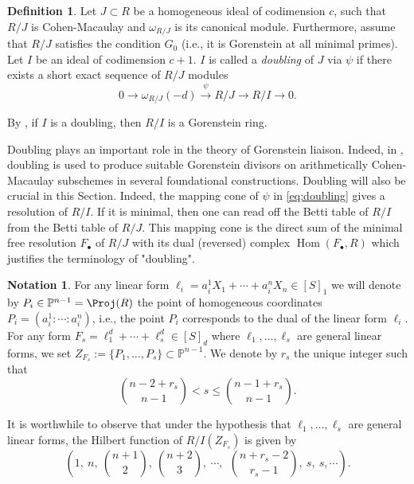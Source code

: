 \documentclass[12pt,twoside]{amsart}
\numberwithin{equation}{section} \hyphenation{semi-stable}
\newcommand {\PP}{\mathbb{P}}
\DeclareMathOperator{\Hom}{Hom}
\theoremstyle{definition}
\newtheorem{definition}[theorem]{Definition}
\newtheorem{Notation}[theorem]{Notation}
\begin{document}
\begin{definition}\label{doubling} Let $J\subset R$ be a homogeneous ideal of codimension $c$, such that $R/J$ is Cohen-Macaulay and $\omega_{R/J}$ is its canonical module. Furthermore, assume that $R/J$ satisfies the condition $G_0$ (i.e., it is Gorenstein at all minimal
primes). %
    Let $I$ be an ideal of codimension $c + 1$. $I$ is called a {\em doubling } of $J$ via $\psi$ if there exists  a short exact sequence of $R/J$ modules
\begin{equation}\label{eq:doubling}
0 \longrightarrow \omega_{R/J}(-d)\stackrel{\psi}{\longrightarrow} R/J \longrightarrow R/I\longrightarrow 0.
\end{equation}

By \cite[Proposition 3.3.18]{BH93}, if $I$ is a doubling, then $R/I$ is a Gorenstein ring. 
\end{definition}

Doubling plays an important role in the theory of Gorenstein liaison. Indeed, in \cite{KMMNP}, doubling is used to produce suitable Gorenstein divisors on arithmetically Cohen-Macaulay subschemes in several foundational constructions.
Doubling will also be crucial in this Section. Indeed,  the mapping cone of $\psi$ in \eqref{eq:doubling} gives a resolution of $R/I $. If it is minimal, then
one can read off the Betti table of $R/I$ from the Betti table of $R/J$. This mapping cone is the direct sum of the minimal free resolution $F_{\bullet }$ of $R/J$ with its dual (reversed) complex $\Hom(F_{\bullet},R)$ which justifies the terminology of "doubling".

\begin{Notation}
    For any linear form $\ell_i=a_i^1X_1+\cdots +a_i^nX_n\in [S]_1$ we will denote by $P_i\in \PP^{n-1}=\Proj(R)$ the point of homogeneous coordinates $P_i=(a_i^1:\cdots :a_i^n)$, i.e., the point $P_i$ corresponds to the dual of the linear form $\ell _i$. For any form $F_s=\ell_1^d+\cdots +\ell_s^d\in [S]_d$  where $\ell_1, \ldots ,\ell_s$ are general linear forms, we set $Z_{F_s}:=\{P_1,\ldots ,P_s\}\subset \PP^{n-1}$. We denote by $r_s$ the unique integer such that
  \vskip 1mm  $$ {n-2+r_s\choose n-1}<s\le {n-1+r_s\choose n-1}.$$
  \vskip 2mm
\end{Notation}

It is worthwhile to observe that under the hypothesis that $\ell_1, \ldots ,\ell_s$ are general linear forms, the Hilbert function of $R/I(Z_{F_s})$ is given by
 \vskip 1mm   
 $$
(1, \ n, \ {n+1\choose 2}, \ {n+2\choose 3}, \ \cdots  , \ \ {n+r_s-2\choose r_s-1}, \ s, \ s,  \cdots  ).
$$
\end{document}
